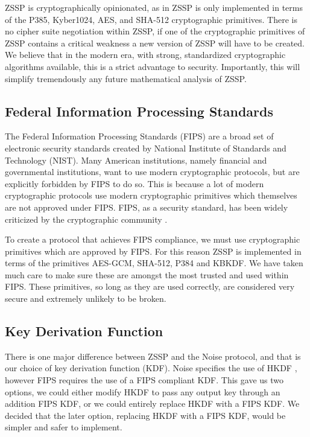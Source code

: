 \documentclass{article}
\begin{document}
ZSSP is cryptographically opinionated, as in ZSSP is only implemented in terms of the P385, Kyber1024, AES, and SHA-512 cryptographic primitives. There is no cipher suite negotiation within ZSSP, if one of the cryptographic primitives of ZSSP contains a critical weakness a new version of ZSSP will have to be created. We believe that in the modern era, with strong, standardized cryptographic algorithms available, this is a strict advantage to security. Importantly, this will simplify tremendously any future mathematical analysis of ZSSP.

\subsection{Federal Information Processing Standards}

The Federal Information Processing Standards (FIPS) are a broad set of electronic security standards created by National Institute of Standards and Technology (NIST). Many American institutions, namely financial and governmental institutions, want to use modern cryptographic protocols, but are explicitly forbidden by FIPS to do so. This is because a lot of modern cryptographic protocols use modern cryptographic primitives which themselves are not approved under FIPS. FIPS, as a security standard, has been widely criticized by the cryptographic community \cite{219400} \cite{fips_blog}.

To create a protocol that achieves FIPS compliance, we must use cryptographic primitives which are approved by FIPS. For this reason ZSSP is implemented in terms of the primitives AES-GCM, SHA-512, P384 and KBKDF. We have taken much care to make sure these are amongst the most trusted and used within FIPS. These primitives, so long as they are used correctly, are considered very secure and extremely unlikely to be broken.

\subsection{Key Derivation Function}

There is one major difference between ZSSP and the Noise protocol, and that is our choice of key derivation function (KDF). Noise specifies the use of HKDF \cite{hkdf}, however FIPS requires the use of a FIPS compliant KDF. This gave us two options, we could either modify HKDF to pass any output key through an addition FIPS KDF, or we could entirely replace HKDF with a FIPS KDF. We decided that the later option, replacing HKDF with a FIPS KDF, would be simpler and safer to implement.
\end{document}
